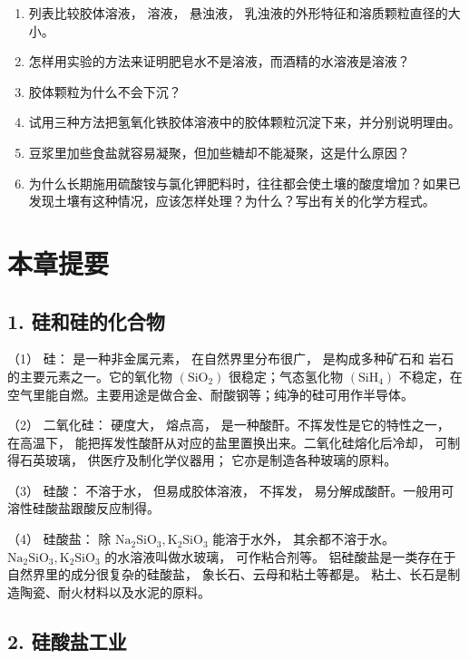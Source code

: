 \begin{enumerate}
\item
  列表比较胶体溶液， 溶液， 悬浊液，
  乳浊液的外形特征和溶质颗粒直径的大小。
\item
  怎样用实验的方法来证明肥皂水不是溶液，而酒精的水溶液是溶液？
\item
  胶体颗粒为什么不会下沉？
\item
  试用三种方法把氢氧化铁胶体溶液中的胶体颗粒沉淀下来，并分别说明理由。
\item
  豆浆里加些食盐就容易凝聚，但加些糖却不能凝聚，这是什么原因？
\item
  为什么长期施用硫酸铵与氯化钾肥料时，往往都会使土壤的酸度增加？如果已发现土壤有这种情况，应该怎样处理？为什么？写出有关的化学方程式。
\end{enumerate}

\section{本章提要}

\subsection{1. 硅和硅的化合物}

（1） 硅： 是一种非金属元素， 在自然界里分布很广， 是构成多种矿石和
岩石的主要元素之一。它的氧化物 \(\left(\mathrm{SiO}_{2}\right)\)
很稳定；气态氢化物 \(\left(\mathrm{SiH}_{4}\right)\)
不稳定，在空气里能自燃。主要用途是做合金、耐酸钢等；纯净的硅可用作半导体。

（2） 二氧化硅： 硬度大， 熔点高， 是一种酸酐。不挥发性是它的特性之一，
在高温下， 能把挥发性酸酐从对应的盐里置换出来。二氧化硅熔化后冷却，
可制得石英玻璃， 供医疗及制化学仪器用； 它亦是制造各种玻璃的原料。

（3） 硅酸： 不溶于水， 但易成胶体溶液， 不挥发，
易分解成酸酐。一般用可溶性硅酸盐跟酸反应制得。

（4） 硅酸盐： 除
\(\mathrm{Na}_{2} \mathrm{SiO}_{3}, \mathrm{K}_{2} \mathrm{SiO}_{3}\)
能溶于水外， 其余都不溶于水。
\(\mathrm{Na}_{2} \mathrm{SiO}_{3}, \mathrm{K}_{2} \mathrm{SiO}_{3}\)
的水溶液叫做水玻璃， 可作粘合剂等。
铝硅酸盐是一类存在于自然界里的成分很复杂的硅酸盐，
象长石、云母和粘土等都是。
粘土、长石是制造陶瓷、耐火材料以及水泥的原料。

\subsection{2. 硅酸盐工业}

